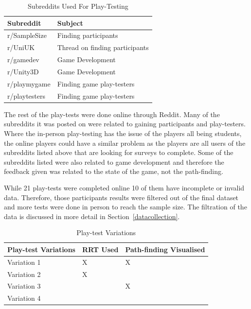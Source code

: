 \documentclass[journal]{IEEEtran}
\begin{document}
	\begin{table}[H]
		\centering
		\caption{Subreddits Used For Play-Testing}
		\label{table:Subreddits}
		\def\arraystretch{1.5}
		\begin{tabular}{ |l|l|}
			\hline
			\textbf{Subreddit}        & \textbf{Subject} \\     \hline
			r/SampleSize              & Finding participants  \\ \hline
			r/UniUK                   & Thread on finding participants \\ \hline
			r/gamedev                 & Game Development \\ \hline
			r/Unity3D                 & Game Development \\ \hline
			r/playmygame              & Finding game play-testers \\ \hline
			r/playtesters             & Finding game play-testers \\ \hline
		\end{tabular}
	\end{table}
	
	The rest of the play-tests were done online through Reddit. Many of the subreddits it was posted on were related to gaining participants and play-testers. Where the in-person play-testing has the issue of the players all being students, the online players could have a similar problem as the players are all users of the subreddits listed above that are looking for surveys to complete. Some of the subreddits listed were also related to game development and therefore the feedback given was related to the state of the game, not the path-finding.     
	
	While 21 play-tests were completed online 10 of them have incomplete or invalid data. Therefore, those participants results were filtered out of the final dataset and more tests were done in person to reach the sample size. The filtration of the data is discussed in more detail in Section~\ref{datacollection}.     
	
	\begin{table}[H]
		\centering
		\caption{Play-test Variations}
		\label{table:PlaytestVariations}
		\def\arraystretch{1.5}
		\begin{tabular}{ |l|l|l|}
			\hline
			\textbf{Play-test Variations} & \textbf{RRT Used}& \textbf{Path-finding Visualised} \\ \hline
			Variation 1  &  X & X \\ \hline
			Variation 2  &  X &  \\ \hline
			Variation 3  &    & X \\ \hline
			Variation 4  &    &  \\ \hline
		\end{tabular}
	\end{table}
	
\end{document}
